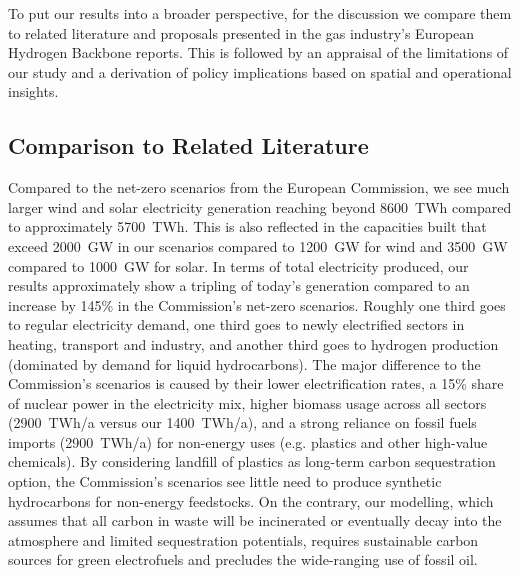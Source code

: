 To put our results into a broader perspective, for the discussion we compare
them to related literature and proposals presented in the gas industry's
European Hydrogen Backbone reports. This is followed by an appraisal of the
limitations of our study and a derivation of policy implications based on
spatial and operational insights.

\subsection*{Comparison to Related Literature}

Compared to the net-zero scenarios from the European
Commission,\cite{in-depth_2018} we see much larger wind and solar electricity
generation reaching beyond 8600~TWh compared to approximately 5700~TWh. This is
also reflected in the capacities built that exceed 2000~GW in our scenarios
compared to 1200~GW for wind and 3500~GW compared to 1000~GW for
solar.\cite{in-depth_2018} In terms of total electricity produced, our results
approximately show a tripling of today's generation compared to an increase by
145\% in the Commission's net-zero scenarios.\cite{in-depth_2018} Roughly one
third goes to regular electricity demand, one third goes to newly electrified
sectors in heating, transport and industry, and another third goes to hydrogen
production (dominated by demand for liquid hydrocarbons). The major difference
to the Commission's scenarios\cite{in-depth_2018} is caused by their lower
electrification rates, a 15\% share of nuclear power in the electricity mix,
higher biomass usage across all sectors (2900~TWh/a versus our 1400~TWh/a), and
a strong reliance on fossil fuels imports (2900~TWh/a) for non-energy uses (e.g.
plastics and other high-value chemicals). By considering landfill of plastics as
long-term carbon sequestration option, the Commission's scenarios see little
need to produce synthetic hydrocarbons for non-energy feedstocks. On the
contrary, our modelling, which assumes that all carbon in waste will be
incinerated or eventually decay into the atmosphere and limited sequestration
potentials, requires sustainable carbon sources for green electrofuels and
precludes the wide-ranging use of fossil oil.

